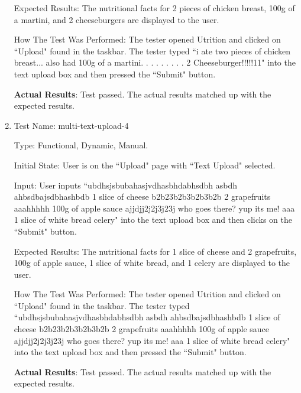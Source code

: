 \documentclass[12pt, titlepage]{article}
\begin{document}
\begin{enumerate}
		Expected Results: The nutritional facts for 2 pieces of chicken breast, 100g of a martini, and 2 cheeseburgers are displayed to the user.
		
		How The Test Was Performed: The tester opened Utrition and clicked on ``Upload" found in the taskbar. The tester typed ``i ate two pieces of chicken breast... also had 100g of a martini. . . . . . . . . 2 Cheeseburger!!!!!11" into the text upload box and then pressed the ``Submit" button.
		
		\textbf{Actual Results}: Test passed. The actual results matched up with the expected results.
		
		\item{Test Name: multi-text-upload-4}
		
		Type: Functional, Dynamic, Manual.
		
		Initial State: User is on the ``Upload" page with ``Text Upload" selected.
		
		Input: User inputs ``ubdhsjsbubahasjvdhasbhdabhsdbh asbdh ahbsdbajsdbhashbdb 1 slice of cheese b2b23b2b3b2b3b2b 2 grapefruits aaahhhhh 100g of apple sauce ajjdjj2j2j3j23j who goes there? yup its me! aaa 1 slice of white bread celery" into the text upload box and then clicks on the ``Submit" button.
		
		Expected Results: The nutritional facts for 1 slice of cheese and 2 grapefruits, 100g of apple sauce, 1 slice of white bread, and 1 celery are displayed to the user.
		
		How The Test Was Performed: The tester opened Utrition and clicked on ``Upload" found in the taskbar. The tester typed ``ubdhsjsbubahasjvdhasbhdabhsdbh asbdh ahbsdbajsdbhashbdb 1 slice of cheese b2b23b2b3b2b3b2b 2 grapefruits aaahhhhh 100g of apple sauce ajjdjj2j2j3j23j who goes there? yup its me! aaa 1 slice of white bread celery" into the text upload box and then pressed the ``Submit" button.
		
		\textbf{Actual Results}: Test passed. The actual results matched up with the expected results.
		
	\end{enumerate}
\end{document}
